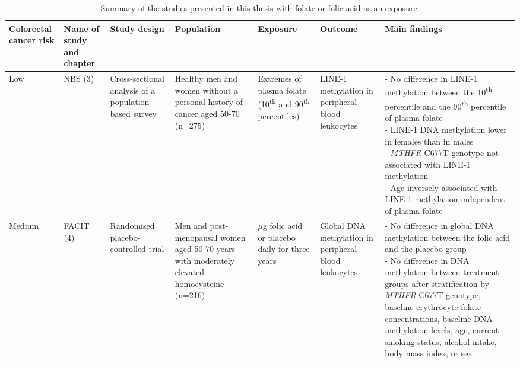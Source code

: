 \documentclass[10pt, letterpaper, twoside]{book} %
\begin{document}
\begin{sidewaystable}
\footnotesize
\caption{Summary of the studies presented in this thesis with folate or folic acid as an exposure.} 
\label{table7_1}
\begin{tabular}{L{1.3cm}C{1.5cm}C{2cm}C{2.1cm}C{2.1cm}C{2.1cm}C{4cm}}
\hline
\bfseries Colorectal cancer risk & \bfseries Name of study and chapter & \bfseries Study design & \bfseries Population & \bfseries Exposure & \bfseries Outcome & \bfseries Main findings\\
\hline
\parbox[t][5.2cm]{1.3cm}{Low} &
\parbox[t][5.2cm]{1.5cm}{\centering NBS (3)} &
\parbox[t][5.2cm]{2cm}{\centering Cross-sectional analysis of a population-based survey} &
\parbox[t][5.2cm]{2.1cm}{\centering Healthy men and women without a personal history of cancer aged 50-70 (n=275)} &
\parbox[t][5.2cm]{2.1cm}{\centering Extremes of plasma folate (10\textsuperscript{th} and 90\textsuperscript{th} percentiles)} &
\parbox[t][5.2cm]{2.1cm}{\centering LINE-1 methylation in peripheral blood leukocytes} & 
\parbox[t][5.2cm]{4cm}{ \centering - No difference in LINE-1 methylation between the 10\textsuperscript{th} percentile and the 90\textsuperscript{th} percentile of plasma folate\\
- LINE-1 DNA methylation lower in females than in males\\
- \emph{MTHFR} C677T genotype not associated with LINE-1 methylation\\
- Age inversely associated with LINE-1 methylation independent of plasma folate}\\

\parbox[t][5.2cm]{1.3cm}{Medium} &
\parbox[t][5.2cm]{1.5cm}{\centering FACIT (4)} &
\parbox[t][5.2cm]{2cm}{\centering Randomised placebo-controlled trial} &
\parbox[t][5.2cm]{2.1cm}{\centering Men and post-menopausal women aged 50-70 years with moderately elevated homocysteine (n=216)} &
\parbox[t][5.2cm]{2.1cm}{ $\mu$g folic acid or placebo daily for three years} &
\parbox[t][5.2cm]{2.1cm}{\centering Global DNA methylation in peripheral blood leukocytes} &
\parbox[t][5.2cm]{4cm}{ \centering - No difference in global DNA methylation between the folic acid and the placebo group \\ - No difference in DNA methylation between treatment groups after stratification by \textit{MTHFR} C677T genotype, baseline erythrocyte folate concentrations, baseline DNA methylation levels, age, current smoking status, alcohol intake, body mass index, or sex}\\
\end{tabular}
\end{sidewaystable}
\end{document}
